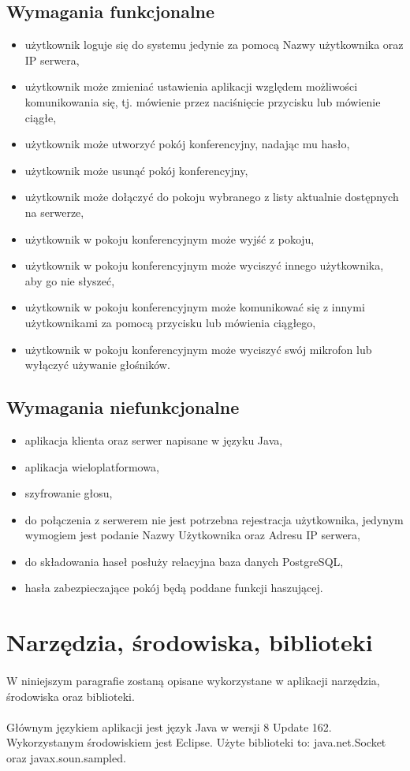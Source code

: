 \documentclass[12pt,a4paper,notitlepage]{report}
\begin{document}
	\subsection{Wymagania funkcjonalne}
	\begin{itemize}
		\item użytkownik loguje się do systemu jedynie za pomocą Nazwy użytkownika oraz IP serwera,
		\item użytkownik może zmieniać ustawienia aplikacji względem możliwości komunikowania się, tj. mówienie przez naciśnięcie przycisku lub mówienie ciągłe,
		\item użytkownik może utworzyć pokój konferencyjny, nadając mu hasło,
		\item użytkownik może usunąć pokój konferencyjny,
		\item użytkownik może dołączyć do pokoju wybranego z listy aktualnie dostępnych na serwerze,
		\item użytkownik w pokoju konferencyjnym może wyjść z pokoju,
		\item użytkownik w pokoju konferencyjnym może wyciszyć innego użytkownika, aby go nie słyszeć,
		\item użytkownik w pokoju konferencyjnym może komunikować się z innymi użytkownikami za pomocą przycisku lub mówienia ciągłego,
		\item użytkownik w pokoju konferencyjnym może wyciszyć swój mikrofon lub wyłączyć używanie głośników.
	\end{itemize}
	\subsection{Wymagania niefunkcjonalne}
	\begin{itemize}
		\item aplikacja klienta oraz serwer napisane w języku Java,
		\item aplikacja wieloplatformowa,
		\item szyfrowanie głosu,
		\item do połączenia z serwerem nie jest potrzebna rejestracja użytkownika, jedynym wymogiem jest podanie Nazwy Użytkownika oraz Adresu IP serwera,
		\item do składowania haseł posłuży relacyjna baza danych PostgreSQL,
		\item hasła zabezpieczające pokój będą poddane funkcji haszującej.
	\end{itemize}
	\section{Narzędzia, środowiska, biblioteki}
	\paragraph*{} W niniejszym paragrafie zostaną opisane wykorzystane w aplikacji narzędzia, środowiska oraz biblioteki. \\
	\paragraph*{} Głównym językiem aplikacji jest język Java w wersji 8 Update 162. Wykorzystanym środowiskiem jest Eclipse. Użyte biblioteki to: java.net.Socket oraz javax.soun.sampled.
\end{document}
